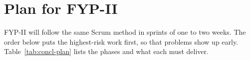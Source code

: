 \documentclass{FastFyp}
\begin{document}


\section{Plan for FYP-II}
FYP-II will follow the same Scrum method in sprints of one to two weeks. The order below puts the highest-risk work first, so that problems show up early. Table~\ref{tab:concl-plan} lists the phases and what each must deliver.
\end{document}
